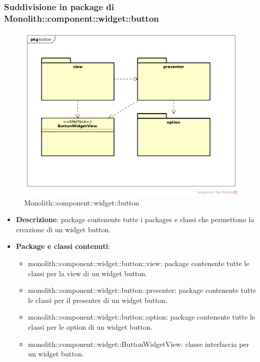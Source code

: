 \subsubsection{Suddivisione in package  di Monolith::component::widget::button}
\label{Monolith::component::widget::button}
\begin{figure}[H]
	\centering
	\includegraphics[scale=0.5]{Sezioni/imgPackage/component_widget_button.png}
	\caption{Monolith::component::widget::button}
\end{figure}
\begin{itemize}
	\item{\textbf{Descrizione}}: package contenente tutte i packages e classi che permettono la creazione di un widget button.
	\item{\textbf{Package e classi contenuti}}:
	\begin{itemize}
	\item{monolith::component::widget::button::view}: package contenente tutte le classi per la view di un widget button.
	\item{monolith::component::widget::button::presenter}: package contenente tutte le classi per il presenter di un widget button.
	\item{monolith::component::widget::button::option}: package contenente tutte le classi per le option di un widget button.
	\item{monolith::component::widget::ButtonWidgetView}: classe interfaccia per un widget button.
	\end{itemize}
	
\end{itemize}


